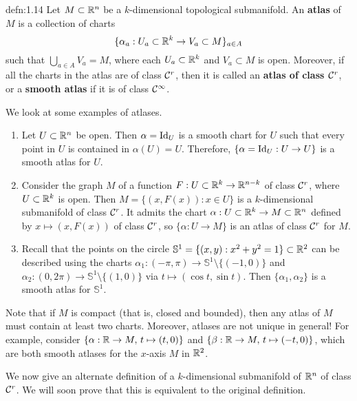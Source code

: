 \begin{defn}{defn:1.14}
    Let $M \subset \mathbb{R}^n$ be a $k$-dimensional topological submanifold. 
    An {\bf atlas} of $M$ is a collection of charts 
    \[ \{\alpha_a : U_a \subset \mathbb{R}^k \to V_a \subset M\}_{a \in A} \] 
    such that $\bigcup_{a \in A} V_a = M$, where each $U_a \subset \mathbb{R}^k$ 
    and $V_a \subset M$ is open. Moreover, if all the charts in the atlas 
    are of class ${\cal C}^r$, then it is called an 
    {\bf atlas of class ${\cal C}^r$}, or a {\bf smooth atlas} if it is of 
    class ${\cal C}^\infty$. 
\end{defn}\vspace{-0.25cm}
We look at some examples of atlases. 
\begin{enumerate}[(1)]
    \item Let $U \subset \mathbb{R}^n$ be open. Then $\alpha = \operatorname{Id}_U$ is a smooth 
    chart for $U$ such that every point in $U$ is contained in $\alpha(U) = U$. 
    Therefore, $\{\alpha = \operatorname{Id}_U : U \to U\}$ is a smooth atlas for $U$. 
    \item Consider the graph $M$ of a function $F : U \subset \mathbb{R}^k \to \mathbb{R}^{n-k}$ 
    of class ${\cal C}^r$, where $U \subset \mathbb{R}^k$ is open. Then 
    $M = \{(x, F(x)) : x \in U\}$ is a $k$-dimensional 
    submanifold of class ${\cal C}^r$. It admits the chart $\alpha : U \subset \mathbb{R}^k 
    \to M \subset \mathbb{R}^n$ defined by $x \mapsto (x, F(x))$ of class ${\cal C}^r$, 
    so $\{\alpha : U \to M\}$ is an atlas of class ${\cal C}^r$ for $M$. 
    \item Recall that the points on the circle $\mathbb{S}^1 = 
    \{(x, y) : x^2 + y^2 = 1\} \subset \mathbb{R}^2$ can be described using 
    the charts $\alpha_1 : (-\pi, \pi) \to \mathbb{S}^1 \setminus \{(-1, 0)\}$ 
    and $\alpha_2 : (0, 2\pi) \to \mathbb{S}^1 \setminus \{(1, 0)\}$ 
    via $t \mapsto (\cos t, \sin t)$. Then $\{\alpha_1, \alpha_2\}$ 
    is a smooth atlas for $\mathbb{S}^1$. 
\end{enumerate}
Note that if $M$ is compact (that is, closed and bounded), then any atlas 
of $M$ must contain at least two charts. Moreover, atlases are not unique in general! 
For example, consider $\{\alpha : \mathbb{R} \to M,\, t \mapsto (t, 0)\}$ 
and $\{\beta : \mathbb{R} \to M,\, t \mapsto (-t, 0)\}$, which are both smooth 
atlases for the $x$-axis $M$ in $\mathbb{R}^2$. 

We now give an alternate definition of a $k$-dimensional submanifold 
of $\mathbb{R}^n$ of class ${\cal C}^r$. We will soon prove that this is equivalent to the 
original definition.

